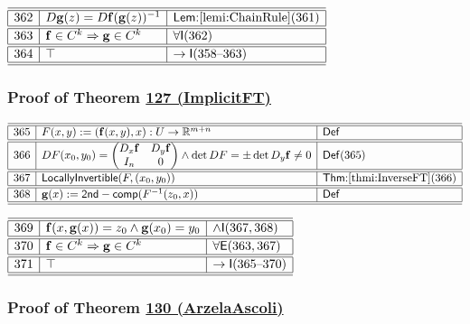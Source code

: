 \documentclass[11pt,reqno]{amsart}
\begin{document}
\noindent$%
\begin{array}{|r|l|l|}
\hline\hline
362 & D\mathbf{g}(z)=D\mathbf{f}(\mathbf{g}(z))^{-1} & \textsf{Lem:}\ref{lemi:ChainRule}(361) \\ \hline\hline
363 & \mathbf{f}\in C^{k}\Rightarrow\mathbf{g}\in C^{k} & \forall\mathsf{I}(362) \\ \hline\hline
364 & \top & \to\mathsf{I}(358\text{--}363) \\ \hline\hline
\end{array}%
$

\medskip

\subsubsection*{Proof of Theorem \hyperlink{thm:ImplicitFT}{127 (\textsf{ImplicitFT})}}

\noindent$%
\begin{array}{|r|l|l|}
\hline\hline
365 & F(x,y):=(\mathbf{f}(x,y),x):U\to\mathbb{R}^{m+n} & \mathsf{Def} \\ \hline\hline
366 & DF(x_{0},y_{0})=
\begin{pmatrix}
D_{x}\mathbf{f} & D_{y}\mathbf{f} \\
I_{n} & 0
\end{pmatrix}
\wedge\det DF=\pm\det D_{y}\mathbf{f}\neq0 & \mathsf{Def}(365) \\ \hline\hline
367 & \mathsf{LocallyInvertible}(F,(x_{0},y_{0})) & \textsf{Thm:}\ref{thmi:InverseFT}(366) \\ \hline\hline
368 & \mathbf{g}(x):=\mathsf{2nd-comp}(F^{-1}(z_{0},x)) & \mathsf{Def} \\ \hline\hline
\end{array}%
$

\medskip

\noindent$%
\begin{array}{|r|l|l|}
\hline\hline
369 & \mathbf{f}(x,\mathbf{g}(x))=z_{0}\wedge\mathbf{g}(x_{0})=y_{0} & \land\mathsf{I}(367,368) \\ \hline\hline
370 & \mathbf{f}\in C^{k}\Rightarrow\mathbf{g}\in C^{k} & \forall\mathsf{E}(363,367) \\ \hline\hline
371 & \top & \to\mathsf{I}(365\text{--}370) \\ \hline\hline
\end{array}%
$

\medskip

\subsubsection*{Proof of Theorem \hyperlink{thm:ArzelaAscoli}{130 (\textsf{ArzelaAscoli})}}
\end{document}
